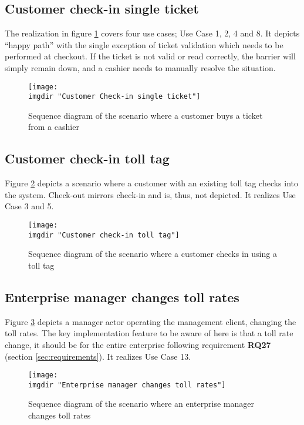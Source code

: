 \subsection{Customer check-in single ticket}
The realization in figure \ref{fig:seq_diag:customer_check_in_single_ticket} covers four use cases; Use Case 1, 2, 4 and 8. It depicts ``happy path'' with the single exception of ticket validation which needs to be performed at checkout. If the ticket is not valid or read correctly, the barrier will simply remain down, and a cashier needs to manually resolve the situation.
\begin{figure}%
  \texttt{[image: \\imgdir "Customer Check-in single ticket"]}
  \caption{Sequence diagram of the scenario where a customer buys a ticket from a cashier}
  \label{fig:seq_diag:customer_check_in_single_ticket}
\end{figure}

\subsection{Customer check-in toll tag}
Figure \ref{fig:seq_diag:customer_check_in_toll_tag} depicts a scenario where a customer with an existing toll tag checks into the system. Check-out mirrors check-in and is, thus, not depicted. It realizes Use Case 3 and 5.
\begin{figure} %
  \texttt{[image: \\imgdir "Customer check-in toll tag"]}
  \caption{Sequence diagram of the scenario where a customer checks in using a toll tag}
  \label{fig:seq_diag:customer_check_in_toll_tag}
\end{figure}

\subsection{Enterprise manager changes toll rates}
Figure \ref{fig:seq_diag:enterprise_manager_changes_toll_rates} depicts a manager actor operating the management client, changing the toll rates. The key implementation feature to be aware of here is that a toll rate change, it should be for the entire enterprise following requirement \textbf{RQ27} (section \ref{sec:requirements}). It realizes Use Case 13.
\begin{figure} %
  \texttt{[image: \\imgdir "Enterprise manager changes toll rates"]}
  \caption{Sequence diagram of the scenario where an enterprise manager changes toll rates}
  \label{fig:seq_diag:enterprise_manager_changes_toll_rates}
\end{figure}

